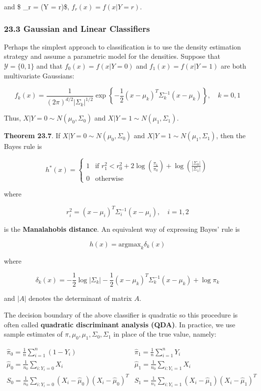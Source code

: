 and \$ \pi\_r = (Y = r)\$, \(f_r(x) = f(x | Y = r)\).

\subsubsection{23.3 Gaussian and Linear Classifiers}\label{gaussian-and-linear-classifiers}

Perhaps the simplest approach to classification is to use the density
estimation strategy and assume a parametric model for the densities.
Suppose that \(\mathcal{Y} = \{ 0, 1 \}\) and that
\(f_0(x) = f(x | Y = 0)\) and \(f_1(x) = f(x | Y = 1)\) are both
multivariate Gaussians:

\[ f_k(x) = \frac{1}{(2\pi)^{d/2} | \Sigma_k |^{1/2}} \exp \left\{ -\frac{1}{2} (x - \mu_k)^T \Sigma_k^{-1} (x - \mu_k) \right\}, \quad k = 0, 1\]

Thus, \(X | Y = 0 \sim N(\mu_0, \Sigma_0)\) and
\(X | Y = 1 \sim N(\mu_1, \Sigma_1)\).

\textbf{Theorem 23.7}. If \(X | Y = 0 \sim N(\mu_0, \Sigma_0)\) and
\(X | Y = 1 \sim N(\mu_1, \Sigma_1)\), then the Bayes rule is

\[
h^*(x) = \begin{cases}
1 & \text{if } r_1^2 < r_0^2 + 2 \log \left( \frac{\pi_1}{\pi_0} \right) + \log \left( \frac{| \Sigma_0 | }{ | \Sigma_1| }
\right) \\
0 & \text{otherwise} 
\end{cases}
\]

where

\[ r_i^2 = (x - \mu_i)^T \Sigma_i^{-1}(x - \mu_i), \quad i = 1, 2 \]

is the \textbf{Manalahobis distance}. An equivalent way of expressing
Bayes' rule is

\[ h(x) = \text{argmax}_k \delta_k(x) \]

where

\[ \delta_k(x) = -\frac{1}{2} \log | \Sigma_k | - \frac{1}{2} (x - \mu_k)^T \Sigma_k^{-1} (x - \mu_k) + \log \pi_k \]

and \(|A|\) denotes the determinant of matrix \(A\).

The decision boundary of the above classifier is quadratic so this
procedure is often called \textbf{quadratic discriminant analysis
(QDA)}. In practice, we use sample estimates of
\(\pi, \mu_0, \mu_1, \Sigma_0, \Sigma_1\) in place of the true value,
namely:

\[
\begin{array}{cc}
\hat{\pi}_0 = \frac{1}{n} \sum_{i=1}^n (1 - Y_i) & \hat{\pi}_1 = \frac{1}{n} \sum_{i=1}^n Y_i \\
\hat{\mu}_0 = \frac{1}{n_0} \sum_{i: Y_i = 0} X_i & \hat{\mu}_1 = \frac{1}{n_0} \sum_{i: Y_i = 1} X_i \\
S_0 = \frac{1}{n_0} \sum_{i: Y_i = 0} (X_i - \hat{\mu}_0) (X_i - \hat{\mu}_0)^T & 
S_1 = \frac{1}{n_1} \sum_{i: Y_i = 1} (X_i - \hat{\mu}_1) (X_i - \hat{\mu}_1)^T
\end{array}
\]

